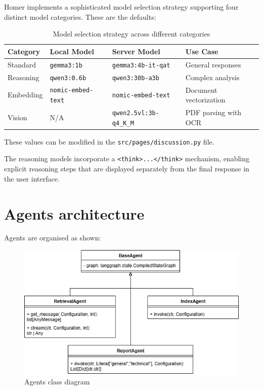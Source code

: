\documentclass[11pt,a4paper]{report}
\begin{document}
Homer implements a sophisticated model selection strategy supporting four distinct model categories. These are the defaults:

\begin{table}[H]
\centering
\begin{tabular}{@{}llll@{}}
\toprule
\textbf{Category} & \textbf{Local Model} & \textbf{Server Model} & \textbf{Use Case} \\
\midrule
Standard & \texttt{gemma3:1b} & \texttt{gemma3:4b-it-qat} & General responses \\
Reasoning & \texttt{qwen3:0.6b} & \texttt{qwen3:30b-a3b} & Complex analysis \\
Embedding & \texttt{nomic-embed-text} & \texttt{nomic-embed-text} & Document vectorization \\
Vision & N/A & \texttt{qwen2.5vl:3b-q4\_K\_M} & PDF parsing with OCR \\
\bottomrule
\end{tabular}
\caption{Model selection strategy across different categories}
\label{tab:model-selection}
\end{table}

These values can be modified in the \texttt{src/pages/discussion.py} file.

The reasoning models incorporate a \texttt{<think>...</think>} mechanism, enabling explicit reasoning steps that are displayed separately from the final response in the user interface.

\section{Agents architecture}

Agents are organised as shown:

\begin{figure}[H]
    \centering
    \includegraphics[width=\linewidth]{static/schemas/classDiagramAgents.drawio.png}
    \caption{Agents class diagram}
    \label{fig:agents}
\end{figure}
\end{document}
